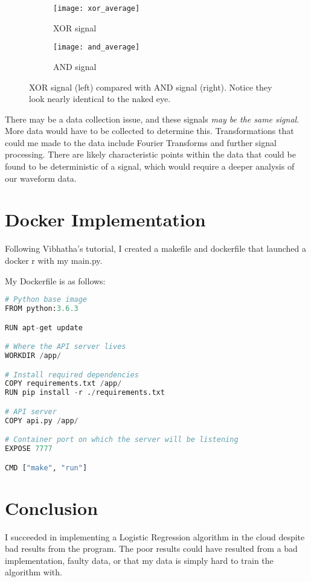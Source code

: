 \documentclass{article}
\begin{document}
\begin{figure}[h]
    \begin{subfigure}{0.5\textwidth}
    \texttt{[image: xor\_average]}
    \caption{XOR signal}
    \label{fig:subim1}
    \end{subfigure}
    \begin{subfigure}{0.5\textwidth}
    \texttt{[image: and\_average]}
    \caption{AND signal}
    \label{fig:subim2}
    \end{subfigure}
 
\caption{XOR signal (left) compared with AND signal (right). Notice they look nearly identical to the naked eye.}
\label{fig:image2}
\end{figure}

There may be a data collection issue, and these signals \emph{may be the same signal}. More data would have to be collected to determine this. Transformations that could me made to the data include Fourier Transforms and further signal processing. There are likely characteristic points within the data that could be found to be deterministic of a signal, which would require a deeper analysis of our waveform data.

\section{Docker Implementation}

Following Vibhatha's tutorial, I created a makefile and dockerfile that launched a docker r with my main.py. 

My Dockerfile is as follows:

\begin{lstlisting}[language=python]
# Python base image
FROM python:3.6.3

RUN apt-get update

# Where the API server lives
WORKDIR /app/

# Install required dependencies
COPY requirements.txt /app/
RUN pip install -r ./requirements.txt

# API server
COPY api.py /app/

# Container port on which the server will be listening
EXPOSE 7777

CMD ["make", "run"]
\end{lstlisting}

\section{Conclusion}

I succeeded in implementing a Logistic Regression algorithm in the cloud despite bad results from the program. The poor results could have resulted from a bad implementation, faulty data, or that my data is simply hard to train the algorithm with. 
\end{document}
